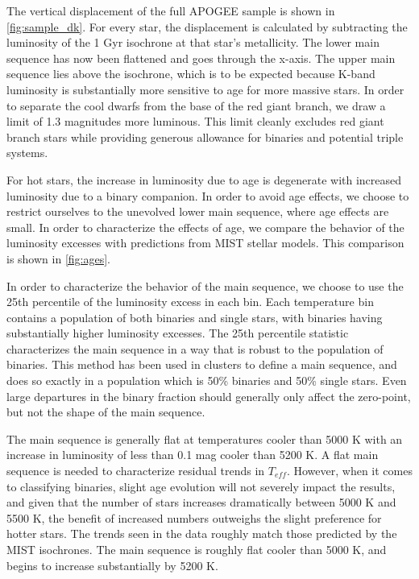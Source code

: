 \documentclass[manuscript]{aastex6}
\newcommand{\Teff}{\ensuremath{T_{eff}}}
\newcommand{\gvs}{\authorcomment1}
\begin{document}
The vertical displacement of the full APOGEE sample is shown in 
\cref{fig:sample_dk}. For every star, the displacement is calculated by
subtracting the luminosity of the 1 Gyr isochrone at that star's metallicity.
The lower main sequence has now been flattened and goes through the x-axis. The
upper main sequence lies above the isochrone, which is to be expected because
K-band luminosity is substantially more sensitive to age for more massive
stars. In order to separate the cool dwarfs from the base of the red giant 
branch, we draw a limit of 1.3 magnitudes more luminous. This limit
cleanly excludes red giant branch stars while providing generous allowance for
binaries and potential triple systems.

For hot stars, the increase in luminosity due to age is degenerate with
increased luminosity due to a binary companion. In order to avoid age effects,
we choose to restrict ourselves to the unevolved lower main sequence, where age
effects are small. In order to characterize the effects of age, we compare the
behavior of the luminosity excesses with predictions from MIST stellar models.
This comparison is shown in \cref{fig:ages}. 

In order to characterize the behavior of the main sequence, we choose to use
the 25th percentile of the luminosity excess in each bin. Each temperature bin
contains a population of both binaries and single stars, with binaries having
substantially higher luminosity excesses. The 25th percentile statistic
characterizes the main sequence in a way that is robust to the population of
binaries. This method has been used in clusters \citep{Mermilliod92} \gvs{Is
this reference correct?} to define a main sequence, and does so exactly in a
population which is 50\% binaries and 50\% single stars. Even large departures
in the binary fraction should generally only affect the zero-point, but not 
the shape of the main sequence.

The main sequence is generally flat at temperatures cooler than 5000 K with
an increase in luminosity of less than 0.1 mag cooler than 5200 K. A flat main
sequence is needed to characterize residual trends in \Teff{}. However, when it
comes to classifying binaries, slight age evolution will not severely impact
the results, and given that the number of stars increases dramatically between
5000 K and 5500 K, the benefit of increased numbers outweighs the slight
preference for hotter stars.  The trends seen in the data roughly match those 
predicted by the MIST isochrones. The main sequence is roughly flat cooler 
than 5000 K, and begins to increase substantially by 5200 K.
\end{document}
